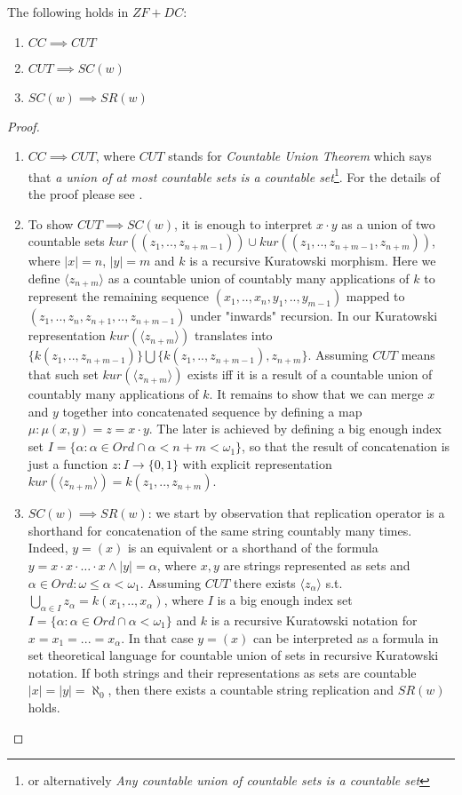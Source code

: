 \begin{lemma}\label{lemma_count_rep}
    The following holds in $ZF+DC$:
    \begin{enumerate}
        \item $CC \implies CUT$
        \item $CUT \implies SC(w)$
        \item $SC(w) \implies SR(w)$
    \end{enumerate}
\end{lemma}
\begin{proof}
    \begin{enumerate}
        \item $CC \implies CUT$, where $CUT$ stands for \textit{Countable Union Theorem} which says that \textit{a union of at most countable sets is a countable set}\footnote{or alternatively \textit{Any countable union of countable sets is a countable set}}. For the details of the proof please see \cite{herrlich2006ac}.
        \item To show $CUT \implies SC(w)$, it is enough to interpret $x \cdot y$ as a union of two countable sets $kur((z_1, .., z_{n+m-1})) \cup kur((z_1, .., z_{n+m-1}, z_{n+m}))$, where $|x| = n$, $|y| = m$ and $k$ is a recursive Kuratowski morphism. Here we define $\langle z_{n+m} \rangle$ as a countable union of countably many applications of $k$ to represent the remaining sequence $(x_1,..,x_n, y_1, .., y_{m-1})$ mapped to $(z_1, .., z_n, z_{n+1}, .., z_{n+m-1})$ under "inwards" recursion. In our Kuratowski representation $kur(\langle z_{n+m} \rangle)$ translates into \\ $\big\{k(z_1, .., z_{n+m-1})\big\} \bigcup \big\{k(z_1, .., z_{n+m-1}), z_{n+m}\big\}$. Assuming $CUT$ means that such set $kur(\langle z_{n+m} \rangle)$ exists iff it is a result of a countable union of countably many applications of $k$. It remains to show that we can merge $x$ and $y$ together into concatenated sequence by defining a map $\mu: \mu(x , y) = z = x \cdot y$. The later is achieved by defining a big enough index set $I = \{\alpha: \alpha \in Ord \cap \alpha < n + m < \omega_1\}$, so that the result of concatenation is just a function $z : I \to \{0,1\}$ with explicit representation $kur(\langle z_{n + m} \rangle) = k(z_1, .., z_{n+m})$.
        \item $SC(w) \implies SR(w)$: we start by observation that replication operator is a shorthand for concatenation of the same string countably many times. Indeed, $y = (x)$ is an equivalent or a shorthand of the formula $y = x \cdot x \cdot \ldots \cdot x \land |y| = \alpha$, where $x,y$ are strings represented as sets and $\alpha \in Ord : \omega \leq \alpha < \omega_1$. Assuming $CUT$ there exists $\langle z_{\alpha} \rangle$ s.t. $\bigcup_{\alpha \in I}{z_\alpha} = k(x_1,..,x_\alpha)$, where $I$ is a big enough index set $I = \{\alpha: \alpha \in Ord \cap \alpha < \omega_1\}$ and $k$ is a recursive Kuratowski notation for $x = x_1 = ... = x_\alpha$. In that case $y = (x)$ can be interpreted as a formula in set theoretical language for countable union of sets in recursive Kuratowski notation. If both strings and their representations as sets are countable $|x|=|y|=\aleph_0$, then there exists a countable string replication and $SR(w)$ holds. 

\end{enumerate}
\end{proof}
